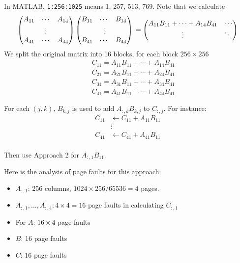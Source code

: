 In MATLAB, {\tt 1:256:1025} means 1, 257, 513, 769. Note that we calculate
\[
\begin{pmatrix}
A_{11} & \cdots & A_{14} \\
& \vdots & \\
A_{41} & \cdots & A_{44}
\end{pmatrix}
\begin{pmatrix}
B_{11} & \cdots & B_{14} \\
& \vdots & \\
B_{41} & \cdots & B_{44}
\end{pmatrix} \\
=
\begin{pmatrix}
A_{11}B_{11} + \cdots +
A_{14}B_{41} & \cdots \\
\vdots & \ddots
\end{pmatrix}
\]
We split the original matrix into 16 blocks, for each block $256 \times 256$
\begin{eqnarray*}
&& C_{11} = A_{11}B_{11} + \cdots +
A_{14}B_{41} \\
&& C_{21} = A_{21}B_{11} + \cdots +
A_{24}B_{41} \\
&& C_{31} = A_{31}B_{11} + \cdots +
A_{34}B_{41} \\
&& C_{41} = A_{41}B_{11} + \cdots +
A_{44}B_{41} 
\end{eqnarray*}

For each $(j,k)$, $B_{k,j}$ is used to add $A_{:,k}B_{k,j}$ to $C_{:,j}$. For instance:
\begin{align*}
    C_{11} & \leftarrow C_{11} + A_{11} B_{11}\\
    & \vdots \\
    C_{41} & \leftarrow C_{41} + A_{41} B_{11}\\
\end{align*}

Then use Approach 2 for $A_{:,1}B_{11}$.

\begin{remark}[Analysis]
    Here is the analysis of page faults for this approach:
    \begin{itemize}
        \item 
        $A_{:,1}$: 256 columns, $1024\times 256 / 65536 = 4$ pages.
        \item 
        $A_{:,1}, \ldots, A_{:,4}: 4 \times 4 = 16$ page faults in calculating $C_{:,1}$
        \item 
        For $A$: $16\times 4$ page faults
        \item
        $B$: 16 page faults
        \item $C$: 16 page faults
    \end{itemize}
\end{remark}

